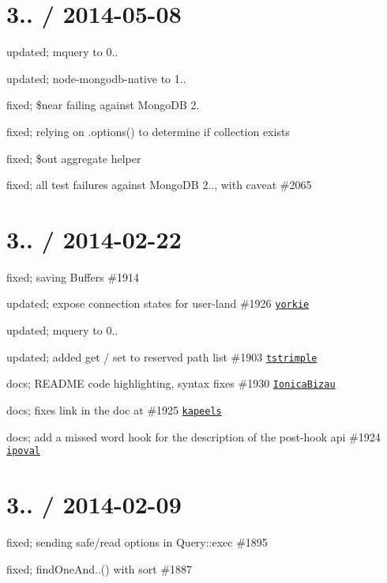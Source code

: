 \section*{3.. / 2014-\/05-\/08 }


\begin{DoxyItemize}
\item updated; mquery to 0..
\item updated; node-\/mongodb-\/native to 1..
\item fixed; \$near failing against Mongo\+DB 2.
\item fixed; relying on .options() to determine if collection exists
\item fixed; \$out aggregate helper
\item fixed; all test failures against Mongo\+DB 2.., with caveat \#2065
\end{DoxyItemize}

\section*{3.. / 2014-\/02-\/22 }


\begin{DoxyItemize}
\item fixed; saving Buffers \#1914
\item updated; expose connection states for user-\/land \#1926 \href{https://github.com/yorkie}{\tt yorkie}
\item updated; mquery to 0..
\item updated; added get / set to reserved path list \#1903 \href{https://github.com/tstrimple}{\tt tstrimple}
\item docs; R\+E\+A\+D\+ME code highlighting, syntax fixes \#1930 \href{https://github.com/IonicaBizau}{\tt Ionica\+Bizau}
\item docs; fixes link in the doc at \#1925 \href{https://github.com/kapeels}{\tt kapeels}
\item docs; add a missed word \textquotesingle{}hook\textquotesingle{} for the description of the post-\/hook api \#1924 \href{https://github.com/ipoval}{\tt ipoval}
\end{DoxyItemize}

\section*{3.. / 2014-\/02-\/09 }


\begin{DoxyItemize}
\item fixed; sending safe/read options in Query\+::exec \#1895
\item fixed; find\+One\+And..() with sort \#1887
\end{DoxyItemize}

